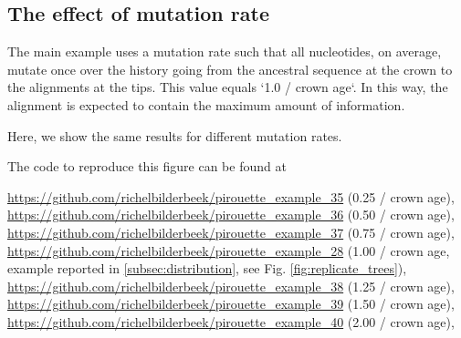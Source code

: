 \subsection{The effect of mutation rate}
\label{subsec:mutation_rate}

The main example uses a mutation rate such that all nucleotides,
on average, mutate once over the history going from the
ancestral sequence at the crown to the alignments at the tips.
This value equals `1.0 / crown age`.
In this way, the alignment is expected to contain the maximum
amount of information.

Here, we show the same results for different mutation rates.


The code to reproduce this figure can be found at
\begin{sloppypar}
  \url{https://github.com/richelbilderbeek/pirouette_example_35} (0.25 / crown age),
  \url{https://github.com/richelbilderbeek/pirouette_example_36} (0.50 / crown age),
  \url{https://github.com/richelbilderbeek/pirouette_example_37} (0.75 / crown age),
  \url{https://github.com/richelbilderbeek/pirouette_example_28} (1.00 / crown age, example reported in \ref{subsec:distribution}, see Fig. \ref{fig:replicate_trees}),
  \url{https://github.com/richelbilderbeek/pirouette_example_38} (1.25 / crown age),
  \url{https://github.com/richelbilderbeek/pirouette_example_39} (1.50 / crown age),
  \url{https://github.com/richelbilderbeek/pirouette_example_40} (2.00 / crown age),
\end{sloppypar}

